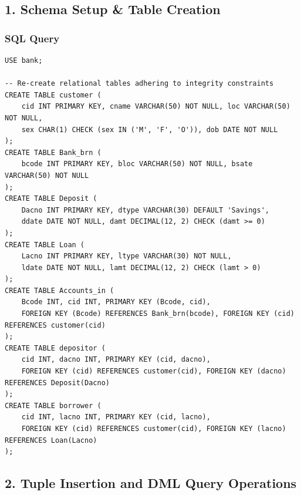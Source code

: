 \subsection*{1. Schema Setup \& Table Creation}

\subsubsection*{SQL Query}
\begin{lstlisting}[basicstyle=\ttfamily\footnotesize,caption={Re-creating banking relational tables with entity and referential constraints}]
USE bank;

-- Re-create relational tables adhering to integrity constraints
CREATE TABLE customer (
    cid INT PRIMARY KEY, cname VARCHAR(50) NOT NULL, loc VARCHAR(50) NOT NULL,
    sex CHAR(1) CHECK (sex IN ('M', 'F', 'O')), dob DATE NOT NULL
);
CREATE TABLE Bank_brn (
    bcode INT PRIMARY KEY, bloc VARCHAR(50) NOT NULL, bsate VARCHAR(50) NOT NULL
);
CREATE TABLE Deposit (
    Dacno INT PRIMARY KEY, dtype VARCHAR(30) DEFAULT 'Savings',
    ddate DATE NOT NULL, damt DECIMAL(12, 2) CHECK (damt >= 0)
);
CREATE TABLE Loan (
    Lacno INT PRIMARY KEY, ltype VARCHAR(30) NOT NULL,
    ldate DATE NOT NULL, lamt DECIMAL(12, 2) CHECK (lamt > 0)
);
CREATE TABLE Accounts_in (
    Bcode INT, cid INT, PRIMARY KEY (Bcode, cid),
    FOREIGN KEY (Bcode) REFERENCES Bank_brn(bcode), FOREIGN KEY (cid) REFERENCES customer(cid)
);
CREATE TABLE depositor (
    cid INT, dacno INT, PRIMARY KEY (cid, dacno),
    FOREIGN KEY (cid) REFERENCES customer(cid), FOREIGN KEY (dacno) REFERENCES Deposit(Dacno)
);
CREATE TABLE borrower (
    cid INT, lacno INT, PRIMARY KEY (cid, lacno),
    FOREIGN KEY (cid) REFERENCES customer(cid), FOREIGN KEY (lacno) REFERENCES Loan(Lacno)
);
\end{lstlisting}

\newpage

\subsection*{2. Tuple Insertion and DML Query Operations}

